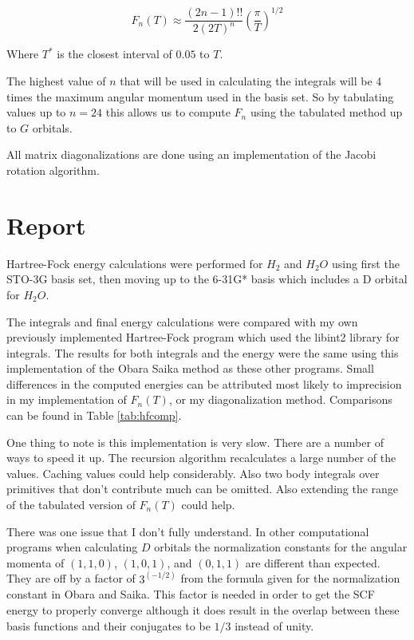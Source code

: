 \documentclass{article}
\begin{document}
\begin{equation}
F_n(T)\approx \frac{(2n-1)!!}{2(2T)^n}\left(\frac{\pi}{T}\right)^{1/2}
\end{equation}

Where $T^*$ is the closest interval of $0.05$ to $T$.

The highest value of $n$ that will be used in calculating the integrals will be 4 times the maximum angular momentum used in the basis set. So by tabulating values up to $n=24$ this allows us to compute $F_n$ using the tabulated method up to $G$ orbitals.

All matrix diagonalizations are done using an implementation of the Jacobi rotation algorithm.

\section{Report}

Hartree-Fock energy calculations were performed for $H_2$ and $H_2O$ using first the STO-3G basis set, then moving up to the 6-31G* basis which includes a D orbital for $H_2O$. 

The integrals and final energy calculations were compared with my own previously implemented Hartree-Fock program which used the libint2 library for integrals. The results for both integrals and the energy were the same using this implementation of the Obara Saika method as these other programs. Small differences in the computed energies can be attributed most likely to imprecision in my implementation of $F_n(T)$, or my diagonalization method. Comparisons can be found in Table \ref{tab:hfcomp}.

One thing to note is this implementation is very slow. There are a number of ways to speed it up. The recursion algorithm recalculates a large number of the values. Caching values could help considerably. Also two body integrals over primitives that don't contribute much can be omitted. Also extending the range of the tabulated version of $F_n(T)$ could help. 

There was one issue that I don't fully understand. In other computational programs when calculating $D$ orbitals the normalization constants for the angular momenta of $(1,1,0)$, $(1,0,1)$, and $(0,1,1)$ are different than expected. They are off by a factor of $3^{(-1/2)}$ from the formula given for the normalization constant in Obara and Saika. This factor is needed in order to get the SCF energy to properly converge although it does result in the overlap between these basis functions and their conjugates to be $1/3$ instead of unity.
\end{document}
